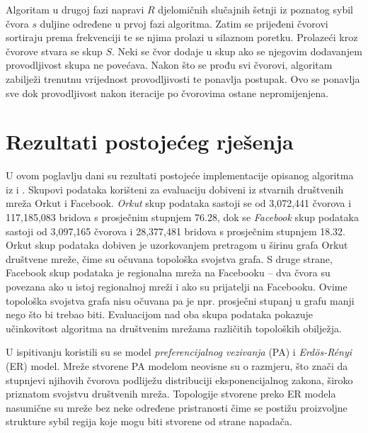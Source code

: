 \documentclass[times, utf8, seminar, numeric]{fer}
\begin{document}
Algoritam u drugoj fazi napravi $R$ djelomičnih slučajnih šetnji iz poznatog sybil čvora $s$ duljine određene u prvoj fazi algoritma. Zatim se prijeđeni čvorovi sortiraju prema frekvenciji te se njima prolazi u silaznom poretku. Prolazeći kroz čvorove stvara se skup $S$. Neki se čvor dodaje u skup ako se njegovim dodavanjem provodljivost skupa ne povećava. Nakon što se prođu svi čvorovi, algoritam zabilježi trenutnu vrijednost provodljivosti te ponavlja postupak. Ovo se ponavlja sve dok provodljivost nakon iteracije po čvorovima ostane nepromijenjena.

\chapter{Rezultati postojećeg rješenja} \label{ch:results}
U ovom poglavlju dani su rezultati postojeće implementacije opisanog algoritma iz \cite{sybil-defender-old} i \cite{sybil-defender}. Skupovi podataka korišteni za evaluaciju dobiveni iz stvarnih društvenih mreža Orkut i Facebook. \textit{Orkut} skup podataka sastoji se od 3,072,441 čvorova i 117,185,083 bridova s prosječnim stupnjem 76.28, dok se \textit{Facebook} skup podataka sastoji od 3,097,165 čvorova i 28,377,481 bridova s prosječnim stupnjem 18.32. Orkut skup podataka dobiven je uzorkovanjem pretragom u širinu grafa Orkut društvene mreže, čime su očuvana topološka svojstva grafa. S druge strane, Facebook skup podataka je regionalna mreža na Facebooku -- dva čvora su povezana ako u istoj regionalnoj mreži i ako su prijatelji na Facebooku. Ovime topološka svojstva grafa nisu očuvana pa je npr. prosječni stupanj u grafu manji nego što bi trebao biti. Evaluacijom nad oba skupa podataka pokazuje učinkovitost algoritma na društvenim mrežama različitih topoloških obilježja.

U ispitivanju koristili su se model \textit{preferencijalnog vezivanja}  (PA) i \textit{Erdös-Rényi} (ER) model. Mreže stvorene PA modelom neovisne su o razmjeru, što znači da stupnjevi njihovih čvorova podliježu distribuciji eksponencijalnog zakona, široko priznatom svojstvu društvenih mreža. Topologije stvorene preko ER modela nasumične su mreže bez neke određene pristranosti čime se postižu proizvoljne strukture sybil regija koje mogu biti stvorene od strane napadača.
\end{document}

